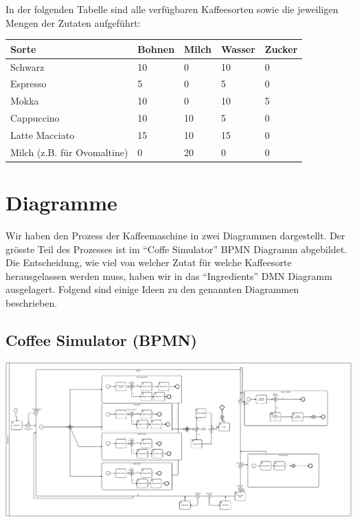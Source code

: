 In der folgenden Tabelle sind alle verfügbaren Kaffeesorten sowie die jeweiligen Mengen der Zutaten aufgeführt:

\begin{longtable}{|p{}|p{}|p{}|p{}|p{}|}
    \hline
    \textbf{Sorte} & \textbf{Bohnen} & \textbf{Milch} & \textbf{Wasser} & \textbf{Zucker}
    \\ \hline
    Schwarz & 10 & 0 & 10 & 0
    \\ \hline
    Espresso & 5 & 0 & 5 & 0
    \\ \hline
    Mokka & 10 & 0 & 10 & 5
    \\ \hline
    Cappuccino & 10 & 10 & 5 & 0
    \\ \hline
    Latte Macciato & 15 & 10 & 15 & 0
    \\ \hline
    Milch (z.B. für Ovomaltine) & 0 & 20 & 0 & 0
    \\ \hline
\end{longtable}\label{tab:coffee-types}


\section{Diagramme}\label{sec:diagramme}
Wir haben den Prozess der Kaffeemaschine in zwei Diagrammen dargestellt.
Der grösste Teil des Prozesses ist im ``Coffe Simulator'' BPMN Diagramm abgebildet.
Die Entscheidung, wie viel von welcher Zutat für welche Kaffeesorte herausgelassen werden muss, haben wir in das ``Ingredients'' DMN Diagramm ausgelagert.
Folgend sind einige Ideen zu den genannten Diagrammen beschrieben.

\subsection{Coffee Simulator (BPMN)}\label{subsec:coffe-simulator-(bpmn)}
\begin{center}
    \includegraphics[width=1\textwidth]{resources/coffee_simulator_bpmn}
\end{center}

